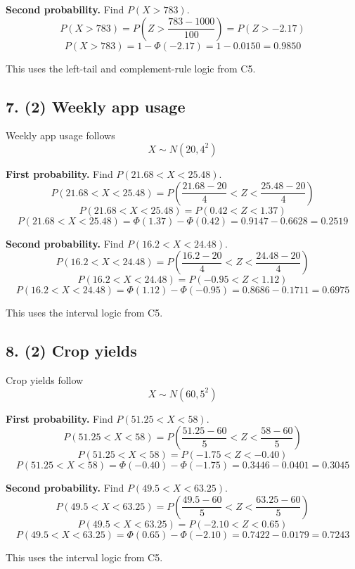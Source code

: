 	\textbf{Second probability.} Find \(P(X>783)\).
	\[
	P(X>783)=P\left(Z>\frac{783-1000}{100}\right)
	=P(Z>-2.17)
	\]
	\[
	P(X>783)=1-\Phi(-2.17)=1-0.0150=0.9850
	\]
	
	This uses the left-tail and complement-rule logic from C5.
	
	
	\subsection*{7. (2) Weekly app usage}
	\label{subsec:contextual-normal-distribution-problems-c6-7}
	Weekly app usage follows
	\[
	X\sim N(20,4^2)
	\]
	
	\textbf{First probability.} Find \(P(21.68<X<25.48)\).
	\[
	P(21.68<X<25.48)
	=
	P\left(\frac{21.68-20}{4}<Z<\frac{25.48-20}{4}\right)
	\]
	\[
	P(21.68<X<25.48)=P(0.42<Z<1.37)
	\]
	\[
	P(21.68<X<25.48)=\Phi(1.37)-\Phi(0.42)
	=0.9147-0.6628
	=0.2519
	\]
	
	\textbf{Second probability.} Find \(P(16.2<X<24.48)\).
	\[
	P(16.2<X<24.48)
	=
	P\left(\frac{16.2-20}{4}<Z<\frac{24.48-20}{4}\right)
	\]
	\[
	P(16.2<X<24.48)=P(-0.95<Z<1.12)
	\]
	\[
	P(16.2<X<24.48)=\Phi(1.12)-\Phi(-0.95)
	=0.8686-0.1711
	=0.6975
	\]
	
	This uses the interval logic from C5.
	
	
	\subsection*{8. (2) Crop yields}
	\label{subsec:contextual-normal-distribution-problems-c6-8}
	Crop yields follow
	\[
	X\sim N(60,5^2)
	\]
	
	\textbf{First probability.} Find \(P(51.25<X<58)\).
	\[
	P(51.25<X<58)
	=
	P\left(\frac{51.25-60}{5}<Z<\frac{58-60}{5}\right)
	\]
	\[
	P(51.25<X<58)=P(-1.75<Z<-0.40)
	\]
	\[
	P(51.25<X<58)=\Phi(-0.40)-\Phi(-1.75)
	=0.3446-0.0401
	=0.3045
	\]
	
	\textbf{Second probability.} Find \(P(49.5<X<63.25)\).
	\[
	P(49.5<X<63.25)
	=
	P\left(\frac{49.5-60}{5}<Z<\frac{63.25-60}{5}\right)
	\]
	\[
	P(49.5<X<63.25)=P(-2.10<Z<0.65)
	\]
	\[
	P(49.5<X<63.25)=\Phi(0.65)-\Phi(-2.10)
	=0.7422-0.0179
	=0.7243
	\]
	
	This uses the interval logic from C5.
	
	
